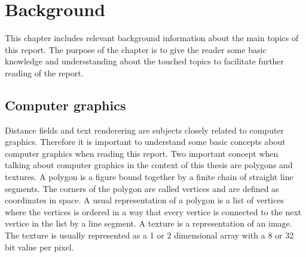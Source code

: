 \chapter{Background}\label{cha:theory}
This chapter includes relevant background information about the main topics of this report. The purpose of the chapter is to give the reader some basic knowledge and undersstanding about the touched topics to facilitate further reading of the report.
\section{Computer graphics}\label{computergraphics}
Distance fields and text renderering are subjects closely related to computer graphics. Therefore it is important to understand some basic concepts about computer graphics when reading this report. Two important concept when talking about computer graphics in the context of this thesis are polygons and textures. A polygon is a figure bound together by a finite chain of straight line segments. The corners of the polygon are called vertices and are defined as coordinates in space. A usual representation of a polygon is a list of vertices where the vertices is ordered in a way that every vertice is connected to the next vertice in the list by a line segment. A texture is a representation of an image. The texture is usually represented as a 1 or 2 dimensional array with a 8 or 32 bit value per pixel. 

